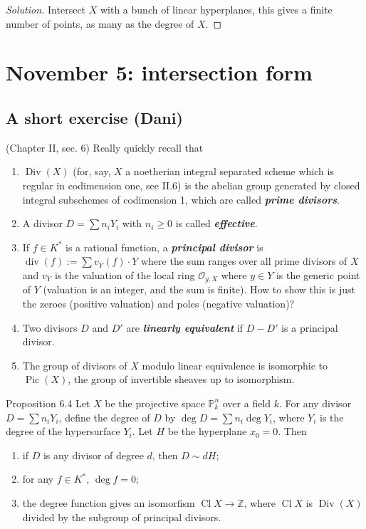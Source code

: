\begin{proof}[Solution]\leavevmode
Intersect $X$ with a bunch of linear hyperplanes, this gives a finite number of points, as many as the degree of $X$.
\end{proof}

\section{November 5: intersection form}

\subsection{A short exercise (Dani)}

(Chapter II, sec. 6) Really quickly recall that 
\begin{enumerate}
\item $\operatorname{Div}(X)$ (for, say, $X$ a noetherian integral separated scheme which is regular in codimension one, see II.6) is the abelian group generated by closed integral subschemes of codimension 1, which are called \textit{\textbf{prime divisors}}.
\item  A divisor $D=\sum n_i Y_i$ with $n_i\geq 0$ is called \textit{\textbf{effective}}.
\item  If $f \in K^*$ is a rational function, a \textit{\textbf{principal divisor}} is $\operatorname{div}(f):=\sum v_Y(f)\cdot Y$ where the sum ranges over all prime divisors of $X$ and $v_Y$ is the valuation of the local ring $\mathcal{O}_{y,X}$ where $y\in Y$ is the generic point of $Y$ (valuation is an integer, and the sum is finite). {\color{2}How to show this is just the zeroes (positive valuation) and poles (negative valuation)?}
\item  Two divisors $D$ and  $D'$ are \textit{\textbf{linearly equivalent}} if $D-D'$ is a principal divisor.
\item The group of divisors of $X$ modulo linear equivalence is isomorphic to $\operatorname{Pic}(X)$, the group of invertible sheaves up to isomorphism.
\end{enumerate}

\begin{thing5}{Proposition 6.4}\leavevmode
	Let $X$ be the projective space $\mathbb{P}^n_k$ over a field $k$. For any divisor $D=\sum n_iY_i$, define the degree of $D$ by $\operatorname{deg}D=\sum n_i\operatorname{deg}Y_i$, where $Y_i$ is the degree of the hypersurface $Y_i$. Let $H$ be the hyperplane $x_0=0$. Then
	\begin{enumerate}[label=(\alph*)]
	\item if $D$ is any divisor of degree $d$, then $D\sim dH$;
	\item for any $f \in K^*$, $\operatorname{deg}f=0$;
\item the degree function gives an isomorfism $\operatorname{Cl}X\to\mathbb{Z}$, where $\operatorname{Cl}X$ is $\operatorname{Div}(X)$ divided by the subgroup of principal divisors. 
\end{enumerate}
\end{thing5}

